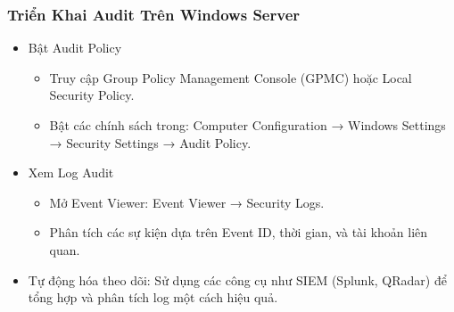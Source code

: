 \documentclass[13pt]{article}
\begin{document}
                \subsubsection{Triển Khai Audit Trên Windows Server}
                \begin{itemize}
                    \item Bật Audit Policy
                    \begin{itemize}
                        \item Truy cập Group Policy Management Console (GPMC) hoặc Local Security Policy.
                        \item Bật các chính sách trong:
Computer Configuration → Windows Settings → Security Settings → Audit Policy.
                        
                    \end{itemize} 
    
                    \item Xem Log Audit
                    \begin{itemize}
                        \item Mở Event Viewer: Event Viewer → Security Logs.
                        \item Phân tích các sự kiện dựa trên Event ID, thời gian, và tài khoản liên quan.
                    \end{itemize}

                    \item Tự động hóa theo dõi: Sử dụng các công cụ như SIEM (Splunk, QRadar) để tổng hợp và phân tích log một cách hiệu quả.
                    
                    \end{itemize}
\end{document}
